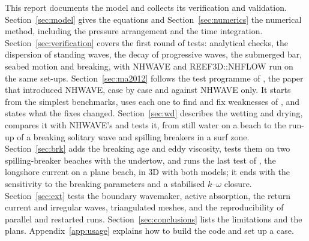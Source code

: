 This report documents the model and collects its verification and validation.
Section~\ref{sec:model} gives the equations and Section~\ref{sec:numerics} the
numerical method, including the pressure arrangement and the time integration.
Section~\ref{sec:verification} covers the first round of tests: analytical
checks, the dispersion of standing waves, the decay of progressive waves, the
submerged bar, seabed motion and breaking, with NHWAVE and REEF3D::NHFLOW
\citep{bihs2016} run on the same set-ups. Section~\ref{sec:ma2012} follows the
test programme of \citet{ma2012}, the paper that introduced NHWAVE, case by
case and against NHWAVE only. It starts from the simplest benchmarks, uses
each one to find and fix weaknesses of \NHFOAM, and states what the fixes
changed. Section~\ref{sec:wd} describes the wetting and drying, compares it
with NHWAVE's and tests it, from still water on a beach to the run-up of a
breaking solitary wave and spilling breakers in a surf zone.
Section~\ref{sec:brk} adds the breaking age and eddy viscosity, tests them on
two spilling-breaker beaches with the undertow, and runs the last test of
\citet{ma2012}, the longshore current on a plane beach, in 3D with both
models; it ends with the sensitivity to the breaking parameters and a
stabilised $k$--$\omega$ closure. Section~\ref{sec:ext} tests the boundary
wavemaker, active absorption, the return current and irregular waves,
triangulated meshes, and the reproducibility of parallel and restarted
runs. Section~\ref{sec:conclusions} lists the limitations and the plans.
Appendix~\ref{app:usage} explains how to build the code and set up a case.
